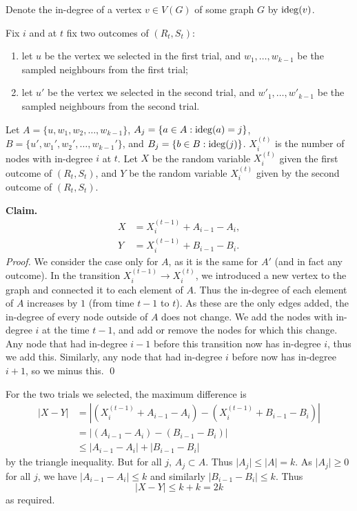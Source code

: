 \subpart\hspace{0em}
\begin{solution}
    Denote the in-degree of a vertex $v \in V(G)$ of some graph $G$ by $\operatorname{ideg}(v)$.

    Fix $i$ and at $t$ fix two outcomes of $(R_t, S_t)$:
    \begin{enumerate}
        \item let $u$ be the vertex we selected in the first trial, and $w_1, \ldots, w_{k-1}$ be the sampled neighbours from the first trial;
        \item let $u'$ be the vertex we selected in the second trial, and $w'_1, \ldots, w'_{k-1}$ be the sampled neighbours from the second trial.
    \end{enumerate}
    Let $A = \{u, w_1, w_2, \ldots, w_{k-1}\}$, $A_j = \{a \in A: \operatorname{ideg}(a) = j\}$, $B = \{u', w_1', w_2', \ldots, w_{k-1}'\}$, and $B_j = \{b \in B: \operatorname{ideg}(j)\}$.
    $X_i^{(t)}$ is the number of nodes with in-degree $i$ at $t$. Let $X$ be the random variable $X_i^{(t)}$ given the first outcome of $(R_t, S_t)$, and $Y$ be the random variable $X_i^{(t)}$ given by the second outcome of $(R_t, S_t)$.

    \vspace{0.5em}
    \textbf{Claim.}
    \begin{align*}
        X  & = X_i^{(t-1)} + A_{i-1} - A_i,   \\
        Y & = X_i^{(t-1)} + B_{i-1} - B_i.
    \end{align*}
    \textit{Proof.} We consider the case only for $A$, as it is the same for $A'$ (and in fact any outcome). In the transition $X_i^{(t-1)} \to X_i^{(t)}$, we introduced a new vertex to the graph and connected it to each element of $A$. Thus the in-degree of each element of $A$ increases by $1$ (from time $t-1$ to $t$). As these are the only edges added, the in-degree of every node outside of $A$ does not change. We add the nodes with in-degree $i$ at the time $t-1$, and add or remove the nodes for which this change. Any node that had in-degree $i-1$ before this transition now has in-degree $i$, thus we add this. Similarly, any node that had in-degree $i$ before now has in-degree $i+1$, so we minus this.
    \qed
    \vspace{0.5em}

    For the two trials we selected, the maximum difference is 
    \begin{align*}
        \lvert X - Y \rvert &= \left\lvert \left(X_i^{(t-1)} + A_{i-1} - A_{i}\right) - \left(X_i^{(t-1)} + B_{i-1} - B_{i}\right) \right\rvert \\
        &= \left\lvert \left(A_{i-1} - A_{i}\right) - \left(B_{i-1} - B_{i}\right) \right\rvert \\
        &\leq \left\lvert A_{i-1} - A_{i} \right\rvert + \left\lvert B_{i-1} - B_{i} \right\rvert
    \end{align*} 
    by the triangle inequality. But for all $j$, $A_j \subset A$. Thus $\lvert A_j \rvert \leq \lvert A \rvert = k$. As $\lvert A_j \rvert \geq 0$ for all $j$, we have $\left\lvert A_{i-1} - A_{i} \right\rvert \leq k$ and similarly $\left\lvert B_{i-1} - B_{i} \right\rvert \leq k$. Thus
    \[ \lvert X - Y \rvert \leq k + k = 2k \]
    as required.
\end{solution}
